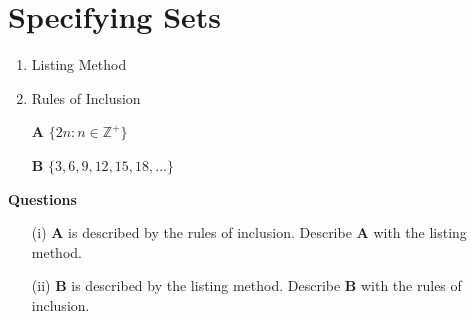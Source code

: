 \documentclass[12pt]{article}
\begin{document}
\section{Specifying Sets}

\begin{enumerate}
\item Listing Method
\item Rules of Inclusion
\end{enumerate}



\begin{itemize}
\item[\textbf{A}] $ \{ 2n : n \in \mathbb{Z^{+}} \} $
\item[\textbf{B}] $ \{ 3,6,9,12,15,18,\ldots \} $
\end{itemize}
\textbf{Questions}
\begin{itemize}
\item[(i)] \textbf{A} is described by the rules of inclusion. Describe \textbf{A} with the listing method.
\item[(ii)] \textbf{B} is described by the listing method. Describe \textbf{B} with the rules of inclusion. 
\end{itemize}
\end{document}
